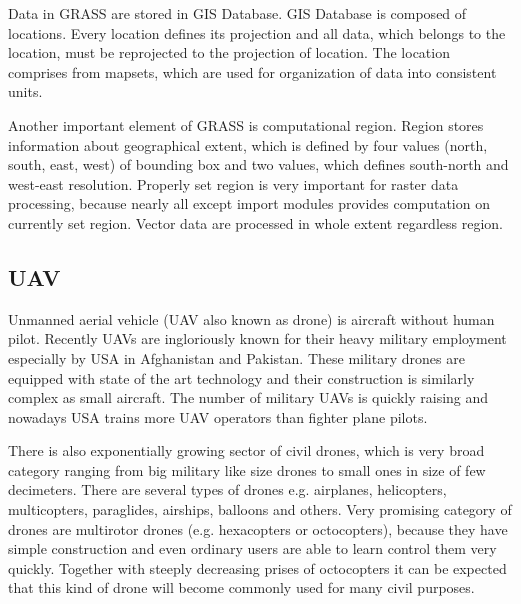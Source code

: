 \documentclass[a4paper,12pt]{article}
\begin{document}

Data in GRASS are stored in GIS Database. GIS Database is composed of locations. Every location 
defines its projection and all data, which belongs to the location, must be reprojected to 
the projection of location. The location comprises from mapsets, which are used for organization 
of data into consistent units. 





Another important element of GRASS is computational region. Region stores information about geographical
extent, which is defined by four values (north, south, east, west) of bounding box and 
two values, which defines south-north and west-east resolution. Properly set region is 
very important for raster data processing, because nearly all except import modules provides computation 
on currently set region. Vector data are processed in whole extent regardless region.

\subsection{UAV}


Unmanned aerial vehicle (UAV also known as drone) is aircraft without human pilot. Recently UAVs are ingloriously known for
their heavy military employment especially by USA in Afghanistan and Pakistan. These military drones are equipped with state of the art 
technology and their construction is similarly complex as small aircraft.  
The number of military UAVs is quickly raising and nowadays USA trains more UAV operators than fighter plane pilots.


There is also exponentially growing sector of civil drones, which is very broad category ranging
from big military like size drones to small ones in size of few decimeters. There are several types of drones e.g. airplanes,
helicopters, multicopters, paraglides, airships, balloons and others. 
Very promising category of drones are multirotor drones (e.g. hexacopters or octocopters), because they have simple construction and 
even ordinary users are able to learn control them very quickly. Together with steeply decreasing prises of octocopters it can be expected 
that this kind of drone will become commonly used for many civil purposes.
\end{document}
